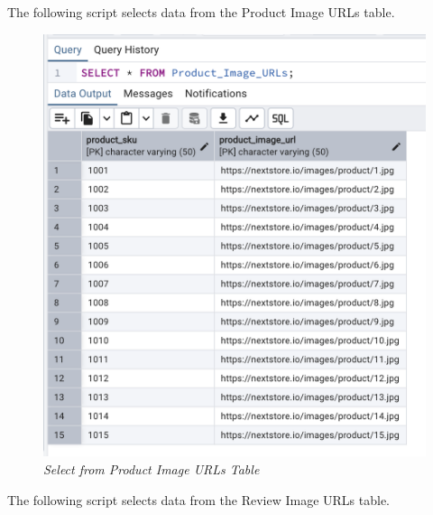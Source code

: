 The following script selects data from the Product Image URLs table.


\begin{figure}[H]
  \centering
  \includegraphics[width=1\textwidth]{images/sql/select/product_image_urls.png}
  \caption{\textit{Select from Product Image URLs Table}}
\end{figure}

The following script selects data from the Review Image URLs table.


